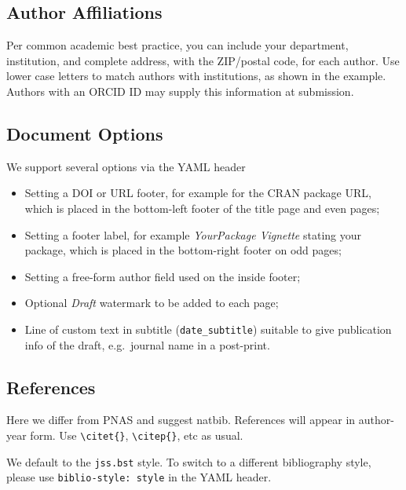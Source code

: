 \documentclass[letterpaper,9pt,twocolumn,twoside,]{pinp}
\providecommand{\tightlist}{%
  \setlength{\itemsep}{0pt}\setlength{\parskip}{0pt}}
\begin{document}
\hypertarget{author-affiliations}{%
\subsection{Author Affiliations}\label{author-affiliations}}

Per common academic best practice, you can include your department,
institution, and complete address, with the ZIP/postal code, for each
author. Use lower case letters to match authors with institutions, as
shown in the example. Authors with an ORCID ID may supply this
information at submission.

\hypertarget{document-options}{%
\subsection{Document Options}\label{document-options}}

We support several options via the YAML header

\begin{itemize}
\tightlist
\item
  Setting a DOI or URL footer, for example for the CRAN package URL,
  which is placed in the bottom-left footer of the title page and even
  pages;
\item
  Setting a footer label, for example \emph{YourPackage Vignette}
  stating your package, which is placed in the bottom-right footer on
  odd pages;
\item
  Setting a free-form author field used on the inside footer;
\item
  Optional \emph{Draft} watermark to be added to each page;
\item
  Line of custom text in subtitle (\texttt{date\_subtitle}) suitable to
  give publication info of the draft, e.g.~journal name in a post-print.
\end{itemize}

\hypertarget{references}{%
\subsection{References}\label{references}}

Here we differ from PNAS and suggest natbib. References will appear in
author-year form. Use \texttt{\textbackslash{}citet\{\}},
\texttt{\textbackslash{}citep\{\}}, etc as usual.

We default to the \texttt{jss.bst} style. To switch to a different
bibliography style, please use \texttt{biblio-style:\ style} in the YAML
header.
\end{document}
